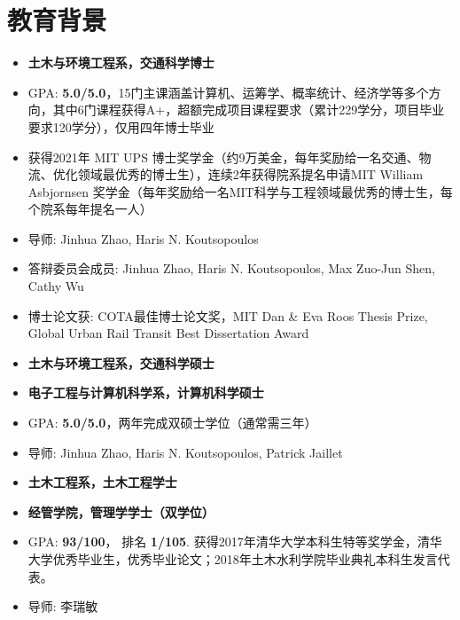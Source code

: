 
\section{教育背景}
\begin{itemize}
\item \textbf{土木与环境工程系，交通科学博士}
\item GPA: \textbf{5.0/5.0}，15门主课涵盖计算机、运筹学、概率统计、经济学等多个方向，其中6门课程获得A+，超额完成项目课程要求（累计229学分，项目毕业要求120学分），仅用四年博士毕业
\item 获得2021年 MIT UPS 博士奖学金（约9万美金，每年奖励给一名交通、物流、优化领域最优秀的博士生），连续2年获得院系提名申请MIT William Asbjornsen 奖学金（每年奖励给一名MIT科学与工程领域最优秀的博士生，每个院系每年提名一人）
\item 导师: Jinhua Zhao, Haris N. Koutsopoulos
\item 答辩委员会成员: Jinhua Zhao, Haris N. Koutsopoulos, Max Zuo-Jun Shen, Cathy Wu
\item 博士论文获: COTA最佳博士论文奖，MIT Dan \& Eva Roos Thesis Prize, Global Urban Rail Transit Best Dissertation Award
\end{itemize}

\begin{itemize}
\item \textbf{土木与环境工程系，交通科学硕士}
\item \textbf{电子工程与计算机科学系，计算机科学硕士}
\item GPA: \textbf{5.0/5.0}，两年完成双硕士学位（通常需三年）
\item 导师: Jinhua Zhao, Haris N. Koutsopoulos, Patrick Jaillet
\end{itemize}

\begin{itemize}
\item \textbf{土木工程系，土木工程学士}
\item \textbf{经管学院，管理学学士（双学位）}
\item GPA: \textbf{93/100}， 排名 \textbf{1/105}. 获得2017年清华大学本科生特等奖学金，清华大学优秀毕业生，优秀毕业论文；2018年土木水利学院毕业典礼本科生发言代表。
\item 导师: 李瑞敏
\end{itemize}
